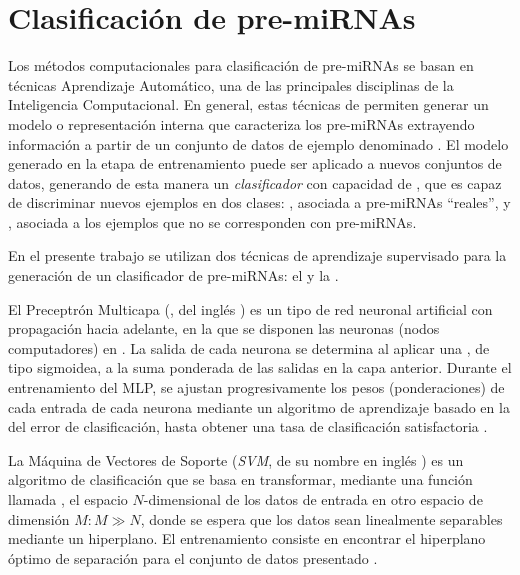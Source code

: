\section{Clasificación de pre-miRNAs}
Los métodos computacionales para clasificación de pre-miRNAs se basan
en técnicas Aprendizaje Automático, una de las principales disciplinas
de la Inteligencia Computacional.  En general, estas técnicas de
 permiten generar un modelo o
representación interna que caracteriza los pre-miRNAs extrayendo
información a partir de un conjunto de datos de ejemplo denominado
.  El modelo generado en la etapa de
entrenamiento puede ser aplicado a nuevos conjuntos de datos,
generando de esta manera un \emph{clasificador} con capacidad de
, que es capaz de discriminar nuevos ejemplos en dos
clases: , asociada a pre-miRNAs ``reales'', y
, asociada a los ejemplos que no se corresponden con
pre-miRNAs.

En el presente trabajo se utilizan dos técnicas de aprendizaje
supervisado para la generación de un clasificador de pre-miRNAs: el
 \cite{mlp1}\cite{mlp2} y la  \cite{svm}.

El Preceptrón Multicapa (, del inglés ) es un tipo de red neuronal artificial con propagación
hacia adelante, en la que se disponen las neuronas (nodos
computadores) en . La salida de cada neurona se determina al
aplicar una , de tipo sigmoidea, a la suma
ponderada de las salidas en la capa anterior. Durante el entrenamiento
del MLP, se ajustan progresivamente los pesos (ponderaciones) de cada
entrada de cada neurona mediante un algoritmo de aprendizaje basado en
la  del error de clasificación, hasta
obtener una tasa de clasificación satisfactoria \cite{jain}.

La Máquina de Vectores de Soporte (\emph{SVM}, de su nombre en inglés
) es un algoritmo de clasificación que se
basa en transformar, mediante una función llamada , el
espacio $N$-dimensional de los datos de entrada en otro espacio de
dimensión $M: M\gg N$, donde se espera que los datos sean linealmente
separables mediante un hiperplano. El entrenamiento consiste en
encontrar el hiperplano óptimo de separación para el conjunto de datos
presentado \cite{bottou}.
